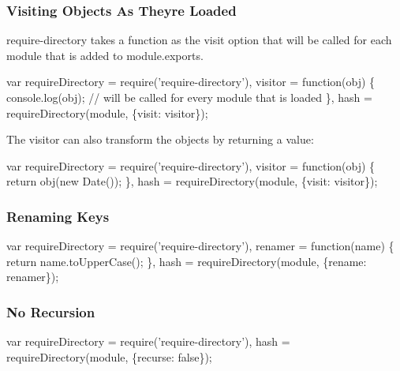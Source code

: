 

\subsubsection*{Visiting Objects As They\textquotesingle{}re Loaded}

{\ttfamily require-\/directory} takes a function as the {\ttfamily visit} option that will be called for each module that is added to module.\+exports.


\begin{DoxyCode}
var requireDirectory = require('require-directory'),
  visitor = function(obj) \{
    console.log(obj); // will be called for every module that is loaded
  \},
  hash = requireDirectory(module, \{visit: visitor\});
\end{DoxyCode}


The visitor can also transform the objects by returning a value\+:


\begin{DoxyCode}
var requireDirectory = require('require-directory'),
  visitor = function(obj) \{
    return obj(new Date());
  \},
  hash = requireDirectory(module, \{visit: visitor\});
\end{DoxyCode}


\subsubsection*{Renaming Keys}


\begin{DoxyCode}
var requireDirectory = require('require-directory'),
  renamer = function(name) \{
    return name.toUpperCase();
  \},
  hash = requireDirectory(module, \{rename: renamer\});
\end{DoxyCode}


\subsubsection*{No Recursion}


\begin{DoxyCode}
var requireDirectory = require('require-directory'),
  hash = requireDirectory(module, \{recurse: false\});
\end{DoxyCode}



